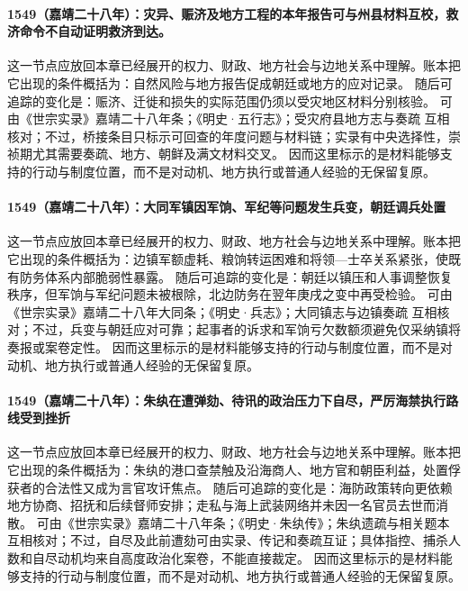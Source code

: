 \paragraph{1549（嘉靖二十八年）：灾异、赈济及地方工程的本年报告可与州县材料互校，救济命令不自动证明救济到达。} 这一节点应放回本章已经展开的权力、财政、地方社会与边地关系中理解。账本把它出现的条件概括为：自然风险与地方报告促成朝廷或地方的应对记录。 随后可追踪的变化是：赈济、迁徙和损失的实际范围仍须以受灾地区材料分别核验。 可由《世宗实录》嘉靖二十八年条；《明史·五行志》；受灾府县地方志与奏疏 互相核对；不过，桥接条目只标示可回查的年度问题与材料链；实录有中央选择性，崇祯期尤其需要奏疏、地方、朝鲜及满文材料交叉。 因而这里标示的是材料能够支持的行动与制度位置，而不是对动机、地方执行或普通人经验的无保留复原。

\paragraph{1549（嘉靖二十八年）：大同军镇因军饷、军纪等问题发生兵变，朝廷调兵处置} 这一节点应放回本章已经展开的权力、财政、地方社会与边地关系中理解。账本把它出现的条件概括为：边镇军额虚耗、粮饷转运困难和将领—士卒关系紧张，使既有防务体系内部脆弱性暴露。 随后可追踪的变化是：朝廷以镇压和人事调整恢复秩序，但军饷与军纪问题未被根除，北边防务在翌年庚戌之变中再受检验。 可由《世宗实录》嘉靖二十八年大同条；《明史·兵志》；大同镇志与边镇奏疏 互相核对；不过，兵变与朝廷应对可靠；起事者的诉求和军饷亏欠数额须避免仅采纳镇将奏报或案卷定性。 因而这里标示的是材料能够支持的行动与制度位置，而不是对动机、地方执行或普通人经验的无保留复原。

\paragraph{1549（嘉靖二十八年）：朱纨在遭弹劾、待讯的政治压力下自尽，严厉海禁执行路线受到挫折} 这一节点应放回本章已经展开的权力、财政、地方社会与边地关系中理解。账本把它出现的条件概括为：朱纨的港口查禁触及沿海商人、地方官和朝臣利益，处置俘获者的合法性又成为言官攻讦焦点。 随后可追踪的变化是：海防政策转向更依赖地方协商、招抚和后续督师安排；走私与海上武装网络并未因一名官员去世而消散。 可由《世宗实录》嘉靖二十八年条；《明史·朱纨传》；朱纨遗疏与相关题本 互相核对；不过，自尽及此前遭劾可由实录、传记和奏疏互证；具体指控、捕杀人数和自尽动机均来自高度政治化案卷，不能直接裁定。 因而这里标示的是材料能够支持的行动与制度位置，而不是对动机、地方执行或普通人经验的无保留复原。

